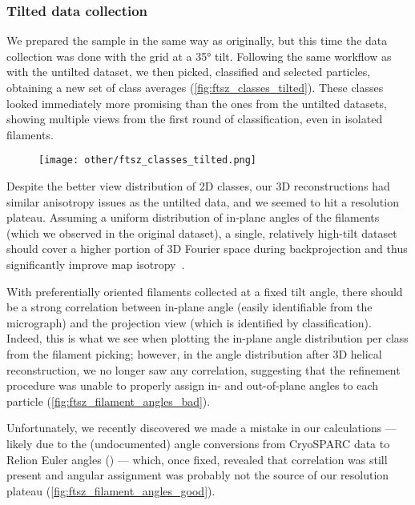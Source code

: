 \subsubsection{Tilted data collection}\label{ftsz_tilted}

We prepared the sample in the same way as originally, but this time the data collection was done with the grid at a 35° tilt.
Following the same workflow as with the untilted dataset, we then picked, classified and selected particles, obtaining a new set of class averages (\autoref{fig:ftsz_classes_tilted}).
These classes looked immediately more promising than the ones from the untilted datasets, showing multiple views from the first round of classification, even in isolated filaments. %

\begin{figure}
    \centering
    \texttt{[image: other/ftsz\_classes\_tilted.png]}
    \label{fig:ftsz_classes_tilted}
\end{figure}

Despite the better view distribution of 2D classes, our 3D reconstructions had similar anisotropy issues as the untilted data, and we seemed to hit a resolution plateau.
Assuming a uniform distribution of in-plane angles of the filaments (which we observed in the original dataset), a single, relatively high-tilt dataset should cover a higher portion of 3D Fourier space during backprojection and thus significantly improve map isotropy~\cite{tanAddressingPreferredSpecimen2017}.

With preferentially oriented filaments collected at a fixed tilt angle, there should be a strong correlation between in-plane angle (easily identifiable from the micrograph) and the projection view (which is identified by classification).
Indeed, this is what we see when plotting the in-plane angle distribution per class from the filament picking;
however, in the angle distribution after 3D helical reconstruction, we no longer saw any correlation, suggesting that the refinement procedure was unable to properly assign in- and out-of-plane angles to each particle (\autoref{fig:ftsz_filament_angles_bad}).

Unfortunately, we recently discovered we made a mistake in our calculations --- likely due to the (undocumented) angle conversions from CryoSPARC data to Relion Euler angles () --- which, once fixed, revealed that correlation was still present and angular assignment was probably not the source of our resolution plateau (\autoref{fig:ftsz_filament_angles_good}).

